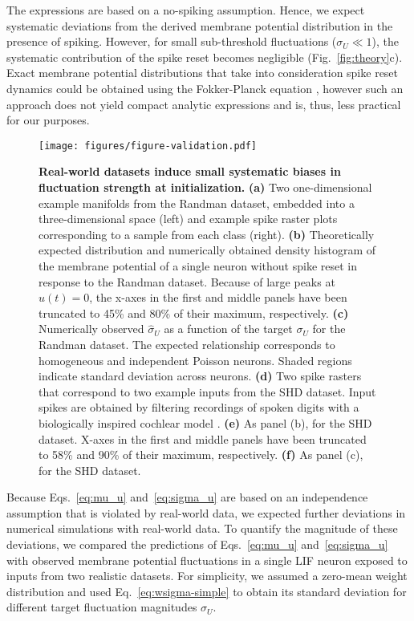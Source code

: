 \documentclass[11pt,a4paper]{article}
\begin{document}
The expressions are based on a no-spiking assumption.
Hence, we expect systematic deviations from the derived membrane potential
distribution in
the presence of spiking.
However, for small sub-threshold fluctuations ($\sigma_U \ll 1$),
the systematic contribution of the spike reset becomes negligible
(Fig.~\ref{fig:theory}c).
Exact membrane potential distributions that take into consideration
spike reset dynamics could be obtained using the Fokker-Planck equation \cite{Amit1997-ds,Gerstner2014-ke}, however such an approach does not yield compact analytic expressions and is, thus, less practical for our purposes.











\begin{figure}[tbh]
    \texttt{[image: figures/figure-validation.pdf]}
    \caption{\textbf{Real-world datasets induce small systematic biases in
fluctuation strength at initialization.}
\textbf{(a)} Two one-dimensional example manifolds from the Randman dataset,
embedded into a three-dimensional space (left) and example spike raster plots
corresponding to a sample from each class (right).
\textbf{(b)} Theoretically expected distribution and numerically obtained density histogram of the membrane potential of a single neuron without spike reset in response to the Randman dataset. Because of large peaks at $u(t)=0$, the x-axes in the first and middle panels have been truncated to 45\% and 80\% of their maximum, respectively. 
\textbf{(c)} Numerically observed $\hat \sigma_U$ as a function of the
target $\sigma_U$ for the Randman dataset. The expected relationship
corresponds to homogeneous and independent Poisson neurons. Shaded regions
indicate standard deviation across neurons.
\textbf{(d)} Two spike rasters that correspond to two example inputs from the
SHD dataset. Input spikes are obtained by filtering recordings of spoken
digits with a biologically inspired cochlear model \citep{cramer_heidelberg_2020}.
\textbf{(e)} As panel (b), for the SHD dataset. X-axes in the first and middle panels have been truncated to 58\% and 90\% of their maximum, respectively. 
\textbf{(f)} As panel (c), for the SHD dataset.
}
\label{fig:valid}
\end{figure}

Because Eqs.~\eqref{eq:mu_u} and~\eqref{eq:sigma_u} are based on an
independence assumption that is violated by real-world data, we expected
further deviations in numerical simulations with real-world data.
To quantify the magnitude of these deviations, we compared the predictions of
Eqs.~\eqref{eq:mu_u} and~\eqref{eq:sigma_u} with observed membrane potential
fluctuations in a single \ac{LIF} neuron exposed to inputs from two realistic
datasets.
For simplicity, we assumed a zero-mean weight distribution and used
Eq.~\eqref{eq:wsigma-simple} to obtain its standard deviation for different
target fluctuation magnitudes $\sigma_U$.
\end{document}
